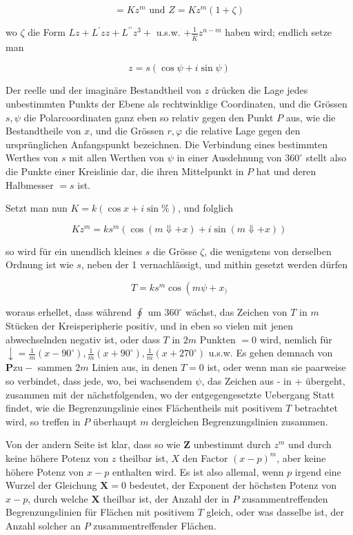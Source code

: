 \documentclass[10pt]{article}
\begin{document}
\[
=K z^{m} \text { und } Z=K z^{m}(1+\zeta)
\]

wo \(\zeta\) die Form \(L z+L^{\prime} z z+L^{\prime \prime} z^{3}+\) u.s.w. \(+\frac{1}{\bar{K}} z^{n-m}\) haben wird; endlich setze man

\[
z=s(\cos \psi+i \sin \psi)
\]

Der reelle und der imaginäre Bestandtheil von \(z\) drücken die Lage jedes unbestimmten Punkts der Ebene als rechtwinklige Coordinaten, und die Grössen \(s, \psi\) die Polarcoordinaten ganz eben so relativ gegen den Punkt \(P\) aus, wie die Bestandtheile von \(x\), und die Grössen \(r, \varphi\) die relative Lage gegen den ursprünglichen Anfangspunkt bezeichnen. Die Verbindung eines bestimmten Werthes von \(s\) mit allen Werthen von \(\psi\) in einer Ausdehnung von \(360^{\circ}\) stellt also die Punkte einer Kreislinie dar, die ihren Mittelpunkt in \(P\) hat und deren Halbmesser \(=s\) ist.

Setzt man nun \(K=k(\cos x+i \sin \%)\), und folglich

\[
K z^{m}=k s^{m}(\cos (m \Downarrow+x)+i \sin (m \Downarrow+x))
\]

so wird für ein unendlich kleines \(s\) die Grösse \(\zeta\), die wenigstens von derselben Ordnung ist wie \(s\), neben der 1 vernachlässigt, und mithin gesetzt werden dürfen

\[
T=k s^{m} \cos \left(m \psi+x_{)}\right.
\]

woraus erhellet, dass während \(\oint\) um \(360^{\circ}\) wächst, das Zeichen von \(T\) in \(m\) Stücken der Kreisperipherie positiv, und in eben so vielen mit jenen abwechselnden negativ ist, oder dass \(T\) in \(2 m\) Punkten \(=0\) wird, nemlich für \(\downarrow=\frac{1}{m}\left(x-90^{\circ}\right), \frac{1}{m}\left(x+90^{\circ}\right), \frac{1}{m}\left(x+270^{\circ}\right)\) u.s.w. Es gehen demnach von \(\boldsymbol{P} \mathrm{zu}-\)
sammen \(2 m\) Linien aus, in denen \(T=0\) ist, oder wenn man sie paarweise so verbindet, dass jede, wo, bei wachsendem \(\psi\), das Zeichen aus - in + übergeht, zusammen mit der nächstfolgenden, wo der entgegengesetzte Uebergang Statt findet, wie die Begrenzungslinie eines Flächentheils mit positivem \(T\) betrachtet wird, so treffen in \(P\) überhaupt \(m\) dergleichen Begrenzungslinien zusammen.

Von der andern Seite ist klar, dass so wie \(\boldsymbol{Z}\) unbestimmt durch \(z^{m}\) und durch keine höhere Potenz von \(z\) theilbar ist, \(X\) den Factor \((x-p)^{m}\), aber keine höhere Potenz von \(x-p\) enthalten wird. Es ist also allemal, wenn \(p\) irgend eine Wurzel der Gleichung \(\boldsymbol{X}=0\) bedeutet, der Exponent der höchsten Potenz von \(x-p\), durch welche \(\mathbf{X}\) theilbar ist, der Anzahl der in \(P\) zusammentreffenden Begrenzungslinien für Flächen mit positivem \(T\) gleich, oder was dasselbe ist, der Anzahl solcher an \(P\) zusammentreffender Flächen.
\end{document}
